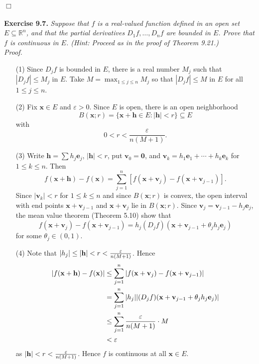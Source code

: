 \documentclass{article}
\begin{document}
$\Box$ \\\\






\textbf{Exercise 9.7.}
\emph{Suppose that $f$ is a real-valued function
defined in an open set $E \subseteq \mathbb{R}^n$,
and that the partial derivatives $D_1 f, \ldots, D_n f$ are bounded in $E$.
Prove that $f$ is continuous in $E$.
(Hint: Proceed as in the proof of Theorem 9.21.)} \\

\emph{Proof.}
\begin{enumerate}
\item[(1)]
  Since $D_j f$ is bounded in $E$, there is a real number $M_j$ such that
  $|D_j f| \leq M_j$ in $E$.
  Take $M = \max_{1 \leq j \leq n} M_j$ so that $|D_j f| \leq M$ in $E$ for all $1 \leq j \leq n$.

\item[(2)]
  Fix $\mathbf{x} \in E$ and $\varepsilon > 0$.
  Since $E$ is open,
  there is an open neighborhood
  \[
    B(\mathbf{x};r)
    = \{ \mathbf{x}+\mathbf{h} \in E : |\mathbf{h}| < r \}
    \subseteq E
  \]
  with
  \[
    0 < r < \frac{\varepsilon}{n(M+1)}.
  \]

\item[(3)]
  Write $\mathbf{h} = \sum h_j \mathbf{e}_j$, $|\mathbf{h}| < r$,
  put $\mathbf{v}_0 = \mathbf{0}$,
  and $\mathbf{v}_k = h_1 \mathbf{e}_1 + \cdots + h_k \mathbf{e}_k$
  for $1 \leq k \leq n$.
  Then
  \[
    f(\mathbf{x}+\mathbf{h}) - f(\mathbf{x})
    = \sum_{j=1}^{n}
      [f(\mathbf{x}+\mathbf{v}_j) - f(\mathbf{x}+\mathbf{v}_{j-1})].
  \]
  Since $|\mathbf{v}_k| < r$ for $1 \leq k \leq n$ and
  since $B(\mathbf{x};r)$ is convex,
  the open interval with end points
  $\mathbf{x}+\mathbf{v}_{j-1}$ and $\mathbf{x}+\mathbf{v}_{j}$ lie in $B(\mathbf{x};r)$.
  Since $\mathbf{v}_{j} = \mathbf{v}_{j-1} - h_j\mathbf{e}_j$,
  the mean value theorem (Theorem 5.10) show that
  \[
    f(\mathbf{x}+\mathbf{v}_j) - f(\mathbf{x}+\mathbf{v}_{j-1})
    = h_j (D_j f)(\mathbf{x}+\mathbf{v}_{j-1} + \theta_j h_j \mathbf{e}_j)
  \]
  for some $\theta_j \in (0,1)$.

\item[(4)]
  Note that $\abs{h_j} \leq \abs{\mathbf{h}} < r < \frac{\varepsilon}{n(M+1)}$.
  Hence
  \begin{align*}
    \abs{f(\mathbf{x}+\mathbf{h}) - f(\mathbf{x})}
    &\leq \sum_{j=1}^{n}
      \abs{f(\mathbf{x}+\mathbf{v}_j) - f(\mathbf{x}+\mathbf{v}_{j-1})} \\
    &= \sum_{j=1}^{n}
      \abs{h_j} \abs{(D_j f)(\mathbf{x}+\mathbf{v}_{j-1} + \theta_j h_j \mathbf{e}_j)} \\
    &\leq \sum_{j=1}^{n}
      \frac{\varepsilon}{n(M+1)} \cdot M \\
    &< \varepsilon
  \end{align*}
  as $\abs{\mathbf{h}} < r < \frac{\varepsilon}{n(M+1)}$.
  Hence $f$ is continuous at all $\mathbf{x} \in E$.
\end{enumerate}
\end{document}
